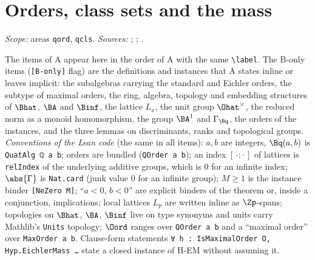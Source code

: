 
\chapter{Orders, class sets and the mass}\label{ch:ch-iii-07-orders}

\noindent\emph{Scope:} areas \texttt{qord}, \texttt{qcls}. \emph{Sources:} \cite{Piz}; \cite{Shz}; \cite{Voi}.

\noindent The items of A appear here in the order of A with the same \texttt{\textbackslash label}. The B-only items (\texttt{[B-only]} flag) are the definitions and instances that
A states inline or leaves implicit: the subalgebras carrying the standard and Eichler orders, the subtype of maximal orders, the ring, algebra, topology and embedding
structures of $\Bhat$, $\BA$ and $\Binf$, the lattice $L_x$, the unit group $\Ohat^\times$, the reduced norm as a monoid homomorphism, the group $\BA^1$ and $\Gamma_{\Bq}$, the orders of the
instances, and the three lemmas on discriminants, ranks and topological groups. \emph{Conventions of the Lean code} (the same in all items): $a,b$ are integers, $\Bq(a,b)$ is \texttt{QuatAlg ℚ a b}; orders are bundled
(\texttt{QOrder a b}); an index $[\,\cdot:\cdot\,]$ of lattices is \texttt{relIndex} of the underlying additive groups, which is $0$ for an infinite index; $\abs{\Gamma}$ is \texttt{Nat.card} (junk value $0$ for an infinite group);
$M\ge1$ is the instance binder \texttt{[NeZero M]}; ``$a<0$, $b<0$'' are explicit binders of the theorem or, inside a conjunction, implications; local lattices $L_p$ are written inline as $\Zp$-spans;
topologies on $\Bhat$, $\BA$, $\Binf$ live on type synonyms and units carry Mathlib's \texttt{Units} topology; $\Oord$ ranges over \texttt{QOrder a b} and a ``maximal order'' over \texttt{MaxOrder a b}.
Clause-form statements \texttt{∀ h : IsMaximalOrder O, Hyp.EichlerMass \dots} state a closed instance of H-EM without assuming it.

